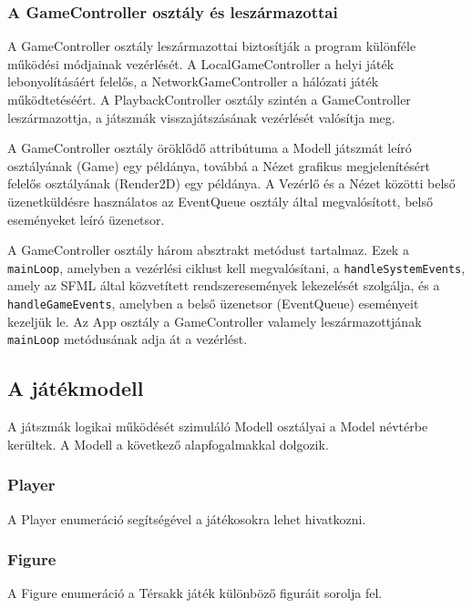 \documentclass[12pt, twoside]{report}
\begin{document}
\subsubsection{A GameController osztály és leszármazottai}

A GameController osztály leszármazottai biztosítják a program különféle működési módjainak vezérlését. A LocalGameController a helyi játék lebonyolításáért felelős, a NetworkGameController a hálózati játék működtetéséért. A PlaybackController osztály szintén a GameController leszármazottja, a játszmák visszajátszásának vezérlését valósítja meg.

A GameController osztály öröklődő attribútuma a Modell játszmát leíró osztályának (Game) egy példánya, továbbá a Nézet grafikus megjelenítésért felelős osztályának (Render2D) egy példánya. A Vezérlő és a Nézet közötti belső üzenetküldésre használatos az EventQueue osztály által megvalósított, belső eseményeket leíró üzenetsor. 

A GameController osztály három absztrakt metódust tartalmaz. Ezek a {\tt mainLoop}, amelyben a vezérlési ciklust kell megvalósítani, a {\tt handleSystemEvents}, amely az SFML által közvetített rendszeresemények lekezelését szolgálja, és a {\tt handleGameEvents}, amelyben a belső üzenetsor (EventQueue) eseményeit kezeljük le. Az App osztály a \break GameController valamely leszármazottjának {\tt mainLoop} metódusának adja át a vezérlést.

\subsection {A játékmodell}

A játszmák logikai működését szimuláló Modell osztályai a Model névtérbe kerültek. A Modell a következő alapfogalmakkal dolgozik.

\subsubsection {Player}
A Player enumeráció segítségével a játékosokra lehet hivatkozni.

\subsubsection{Figure}
A Figure enumeráció a Térsakk játék különböző figuráit sorolja fel.
\end{document}
